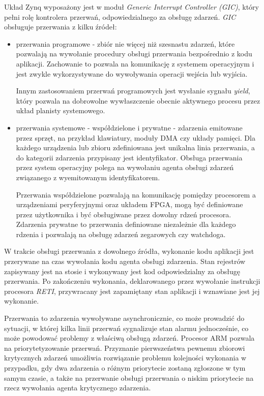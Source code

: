 Układ Zynq wyposażony jest w moduł \emph{Generic Interrupt Controller (GIC)}, który pełni rolę kontrolera przerwań, odpowiedzialnego za obsługę zdarzeń. \emph{GIC} obsługuje przerwania z kilku źródeł:
\begin{itemize}
	\item przerwania programowe - zbiór nie więcej niż szesnastu zdarzeń, które pozwalają na wywołanie procedury obsługi przerwania bezpośrednio z kodu aplikacji. Zachowanie to pozwala na komunikację z systemem operacyjnym i jest zwykle wykorzystywane do wywoływania operacji wejścia lub wyjścia. 
	
	Innym zastosowaniem przerwań programowych jest wysłanie sygnału \emph{yield}, który pozwala na dobrowolne wywłaszczenie obecnie aktywnego procesu przez układ planisty systemowego.
	
	\item przerwania systemowe - współdzielone i prywatne - zdarzenia emitowane przez sprzęt, na przykład klawiatury, moduły DMA czy układy pamięci. Dla każdego urządzenia lub zbioru zdefiniowana jest unikalna linia przerwania, a do kategorii zdarzenia przypisany jest identyfikator. Obsługa przerwania przez system operacyjny polega na wywołaniu agenta obsługi zdarzeń związanego z wyemitowanym identyfikatorem.
	
	Przerwania współdzielone pozwalają na komunikację pomiędzy procesorem a urządzeniami peryferyjnymi oraz układem FPGA, mogą być definiowane przez użytkownika i być obsługiwane przez dowolny rdzeń procesora. Zdarzenia prywatne to przerwania definiowane niezależnie dla każdego rdzenia i pozwalają na obsługę zdarzeń zegarowych czy watchdoga.
\end{itemize}

W trakcie obsługi przerwania z dowolnego źródła, wykonanie kodu aplikacji jest przerywane na czas wywołania kodu agenta obsługi zdarzenia. Stan rejestrów zapisywany jest na stosie i wykonywany jest kod odpowiedzialny za obsługę przerwania. Po zakończeniu wykonania, deklarowanego przez wywołanie instrukcji procesora \emph{RETI}, przywracany jest zapamiętany stan aplikacji i wznawiane jest jej wykonanie.

Przerwania to zdarzenia wywoływane asynchronicznie, co może prowadzić do sytuacji, w której kilka linii przerwań sygnalizuje stan alarmu jednocześnie, co może powodować problemy z właściwą obsługą zdarzeń. Procesor ARM pozwala na priorytetyzowanie przerwań. Przyznanie pierwszeństwa pewnemu zbiorowi krytycznych zdarzeń umożliwia rozwiązanie problemu kolejności wykonania w przypadku, gdy dwa zdarzenia o różnym priorytecie zostaną zgłoszone w tym samym czasie, a także na przerwanie obsługi przerwania o niskim priorytecie na rzecz wywołania agenta krytycznego zdarzenia.

